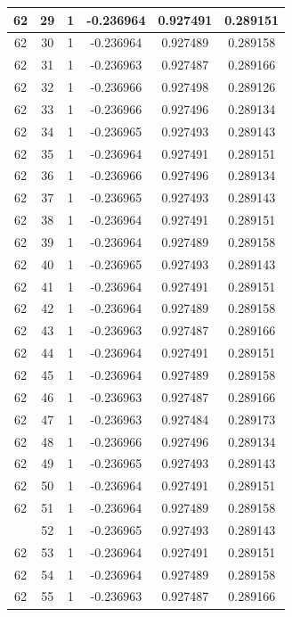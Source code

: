 \documentclass[12pt,a4paper]{article}
\numberwithin{equation}{section}
\numberwithin{figure}{section}
\numberwithin{table}{section}
\begin{document}
\begin{longtable}{|c|c|c|c|c|c|}
62 & 29 & 1 & -0.236964 & 0.927491 & 0.289151 \\ \hline
62 & 30 & 1 & -0.236964 & 0.927489 & 0.289158 \\ \hline
62 & 31 & 1 & -0.236963 & 0.927487 & 0.289166 \\ \hline
62 & 32 & 1 & -0.236966 & 0.927498 & 0.289126 \\ \hline
62 & 33 & 1 & -0.236966 & 0.927496 & 0.289134 \\ \hline
62 & 34 & 1 & -0.236965 & 0.927493 & 0.289143 \\ \hline
62 & 35 & 1 & -0.236964 & 0.927491 & 0.289151 \\ \hline
62 & 36 & 1 & -0.236966 & 0.927496 & 0.289134 \\ \hline
62 & 37 & 1 & -0.236965 & 0.927493 & 0.289143 \\ \hline
62 & 38 & 1 & -0.236964 & 0.927491 & 0.289151 \\ \hline
62 & 39 & 1 & -0.236964 & 0.927489 & 0.289158 \\ \hline
62 & 40 & 1 & -0.236965 & 0.927493 & 0.289143 \\ \hline
62 & 41 & 1 & -0.236964 & 0.927491 & 0.289151 \\ \hline
62 & 42 & 1 & -0.236964 & 0.927489 & 0.289158 \\ \hline
62 & 43 & 1 & -0.236963 & 0.927487 & 0.289166 \\ \hline
62 & 44 & 1 & -0.236964 & 0.927491 & 0.289151 \\ \hline
62 & 45 & 1 & -0.236964 & 0.927489 & 0.289158 \\ \hline
62 & 46 & 1 & -0.236963 & 0.927487 & 0.289166 \\ \hline
62 & 47 & 1 & -0.236963 & 0.927484 & 0.289173 \\ \hline
62 & 48 & 1 & -0.236966 & 0.927496 & 0.289134 \\ \hline
62 & 49 & 1 & -0.236965 & 0.927493 & 0.289143 \\ \hline
62 & 50 & 1 & -0.236964 & 0.927491 & 0.289151 \\ \hline
62 & 51 & 1 & -0.236964 & 0.927489 & 0.289158 \\ \hline
\pagebreak
62 & 52 & 1 & -0.236965 & 0.927493 & 0.289143 \\ \hline
62 & 53 & 1 & -0.236964 & 0.927491 & 0.289151 \\ \hline
62 & 54 & 1 & -0.236964 & 0.927489 & 0.289158 \\ \hline
62 & 55 & 1 & -0.236963 & 0.927487 & 0.289166 \\ \hline

\end{longtable}
\end{document}
